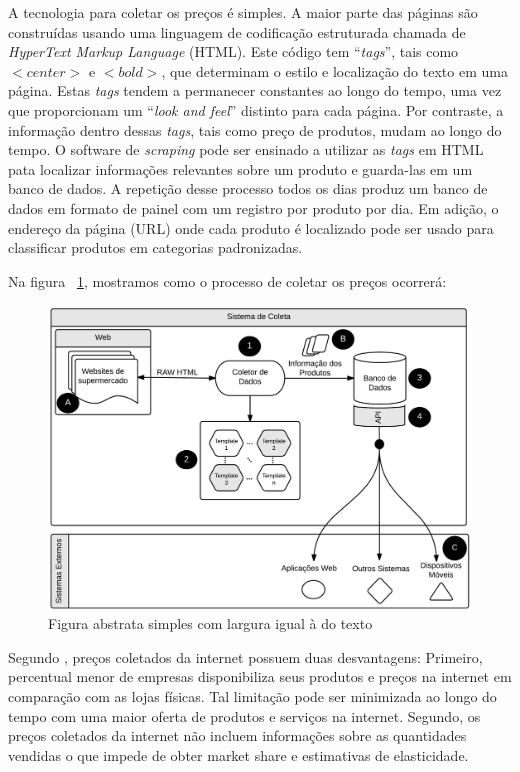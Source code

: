 \documentclass[twoside,a4paper,11pt]{report}
\begin{document}
A tecnologia para coletar os preços é simples. A maior parte das páginas são construídas usando uma linguagem de codificação estruturada chamada de \emph{HyperText Markup Language} (HTML). Este código tem “\emph{tags}”, tais como $<center>$ e $<bold>$, que determinam o estilo e localização do texto em uma página. Estas \emph{tags} tendem a permanecer constantes ao longo do tempo, uma vez que proporcionam um “\emph{look and feel}” distinto para cada página. Por contraste, a informação dentro dessas \emph{tags}, tais como preço de produtos, mudam ao longo do tempo. O software de \emph{scraping} pode ser ensinado a utilizar as \emph{tags} em HTML pata localizar informações relevantes sobre um produto e guarda-las em um banco de dados. A repetição desse processo todos os dias produz um banco de dados em formato de painel com um registro por produto por dia. Em adição, o endereço da página (URL) onde cada produto é localizado pode ser usado para classificar produtos em categorias padronizadas. 

Na figura ~\ref{fig:01}, mostramos como o processo de coletar os preços ocorrerá:

\begin{figure}[htbp]
  \centering
  \includegraphics[width=\textwidth]{WebScraping}
  \caption[Figura Simples]{Figura abstrata simples com largura igual à do texto}
  \label{fig:01}
\end{figure}

Segundo \citet{cavallo2010scraped}, preços coletados da internet possuem duas desvantagens: Primeiro, percentual menor de empresas disponibiliza seus produtos e preços na internet em comparação com as lojas físicas. Tal limitação pode ser minimizada ao longo do tempo com uma maior oferta de produtos e serviços na internet. Segundo, os preços coletados da internet não incluem informações sobre as quantidades vendidas o que impede de obter market share e estimativas de elasticidade.
\end{document}
